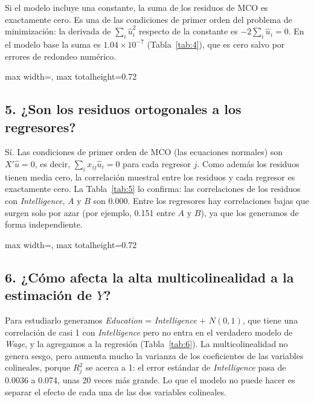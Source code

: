 \documentclass[11pt,a4paper]{article}
\newcommand{\tabla}[1]{\begin{adjustbox}{max width=\linewidth, max totalheight=0.72\textheight}\end{adjustbox}}
\begin{document}
Si el modelo incluye una constante, la suma de los residuos de MCO es exactamente cero. Es una de las condiciones de primer orden del problema de minimización: la derivada de $\sum_i\hat u_i^2$ respecto de la constante es $-2\sum_i\hat u_i=0$. En el modelo base la suma es $1.04\times10^{-7}$ (Tabla~\ref{tab:4}), que es cero salvo por errores de redondeo numérico.

\begin{table}[H]\centering
\caption{Suma de los residuos del modelo base}\label{tab:4}
\tabla{"../output/Tabla 4.tex"}
\end{table}

\subsection*{5. ¿Son los residuos ortogonales a los regresores?}

Sí. Las condiciones de primer orden de MCO (las ecuaciones normales) son $X'\hat u=0$, es decir, $\sum_i x_{ij}\hat u_i=0$ para cada regresor $j$. Como además los residuos tienen media cero, la correlación muestral entre los residuos y cada regresor es exactamente cero. La Tabla~\ref{tab:5} lo confirma: las correlaciones de los residuos con \textit{Intelligence}, $A$ y $B$ son 0.000. Entre los regresores hay correlaciones bajas que surgen solo por azar (por ejemplo, 0.151 entre $A$ y $B$), ya que los generamos de forma independiente.

\begin{table}[H]\centering
\caption{Correlaciones entre los residuos y los regresores}\label{tab:5}
\tabla{"../output/Tabla 5.tex"}
\end{table}

\subsection*{6. ¿Cómo afecta la alta multicolinealidad a la estimación de $Y$?}

Para estudiarlo generamos \textit{Education} = \textit{Intelligence} + $N(0,1)$, que tiene una correlación de casi 1 con \textit{Intelligence} pero no entra en el verdadero modelo de \textit{Wage}, y la agregamos a la regresión (Tabla~\ref{tab:6}). La multicolinealidad no genera sesgo, pero aumenta mucho la varianza de los coeficientes de las variables colineales, porque $R^2_j$ se acerca a 1: el error estándar de \textit{Intelligence} pasa de 0.0036 a 0.074, unas 20 veces más grande. Lo que el modelo no puede hacer es separar el efecto de cada una de las dos variables colineales.
\end{document}
